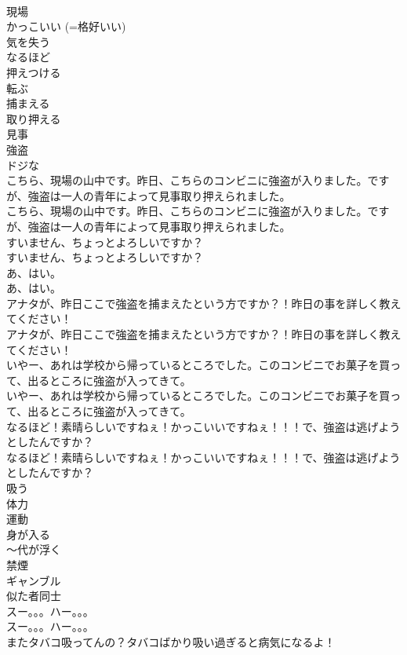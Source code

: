 \documentclass[8pt]{extreport}
\begin{document}
\begin{CJK}{UTF8}{min}
\\	現場
\\	かっこいい (=格好いい)
\\	気を失う
\\	なるほど
\\	押えつける
\\	転ぶ
\\	捕まえる
\\	取り押える
\\	見事
\\	強盗
\\	ドジな
\\	こちら、現場の山中です。昨日、こちらのコンビニに強盗が入りました。ですが、強盗は一人の青年によって見事取り押えられました。	
\\	こちら、現場の山中です。昨日、こちらのコンビニに強盗が入りました。ですが、強盗は一人の青年によって見事取り押えられました。 
\\	すいません、ちょっとよろしいですか？	
\\	すいません、ちょっとよろしいですか？ 
\\	あ、はい。	
\\	あ、はい。 
\\	アナタが、昨日ここで強盗を捕まえたという方ですか？！昨日の事を詳しく教えてください！	
\\	アナタが、昨日ここで強盗を捕まえたという方ですか？！昨日の事を詳しく教えてください！ 
\\	いやー、あれは学校から帰っているところでした。このコンビニでお菓子を買って、出るところに強盗が入ってきて。	
\\	いやー、あれは学校から帰っているところでした。このコンビニでお菓子を買って、出るところに強盗が入ってきて。 
\\	なるほど！素晴らしいですねぇ！かっこいいですねぇ！！！で、強盗は逃げようとしたんですか？	
\\	なるほど！素晴らしいですねぇ！かっこいいですねぇ！！！で、強盗は逃げようとしたんですか？ 
\\	吸う
\\	体力
\\	運動
\\	身が入る
\\	〜代が浮く
\\	禁煙
\\	ギャンブル
\\	似た者同士
\\	スー。。。ハー。。。	
\\	スー。。。ハー。。。 
\\	またタバコ吸ってんの？タバコばかり吸い過ぎると病気になるよ！	

\end{CJK}
\end{document}
